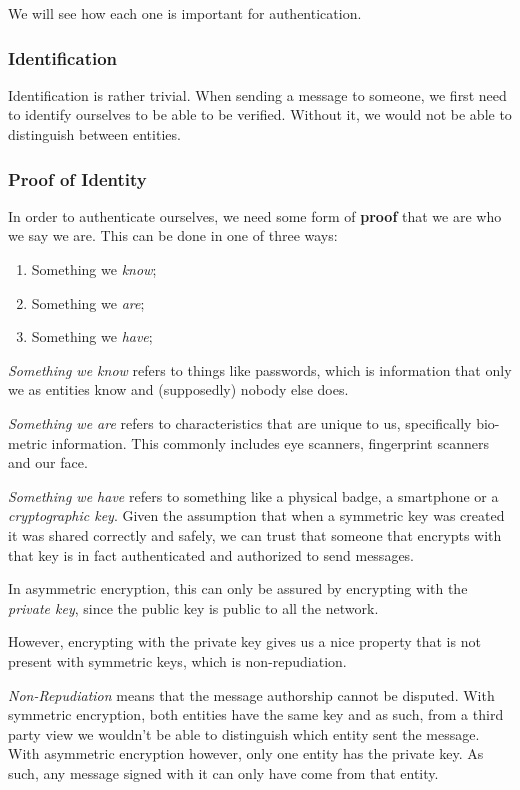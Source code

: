 \documentclass[12pt,a4paper]{article}
\theoremstyle{definition}
\begin{document}
We will see how each one is important for authentication.

\subsubsection{Identification}

Identification is rather trivial. When sending a message to someone, we first need to identify ourselves to be able to be verified. Without it, we would not be able to distinguish between entities.

\subsubsection{Proof of Identity}

In order to authenticate ourselves, we need some form of \textbf{proof} that we are who we say we are. 
This can be done in one of three ways:
\begin{enumerate}
    \item Something we \emph{know};
    \item Something we \emph{are};
    \item Something we \emph{have};
\end{enumerate}

\emph{Something we know} refers to things like passwords, which is information that only we as entities know and (supposedly) nobody else does.

\emph{Something we are} refers to characteristics that are unique to us, specifically bio-metric information. This commonly includes eye scanners, fingerprint scanners and our face. 

\emph{Something we have} refers to something like a physical badge, a smartphone or a \emph{cryptographic key}.
Given the assumption that when a symmetric key was created it was shared correctly and safely, we can trust that someone that encrypts with that key is in fact authenticated and authorized to send messages. 

In asymmetric encryption, this can only be assured by encrypting with the \emph{private key}, since the public key is public to all the network.

However, encrypting with the private key gives us a nice property that is not present with symmetric keys, which is non-repudiation.

\emph{Non-Repudiation} means that the message authorship cannot be disputed. With symmetric encryption, both entities have the same key and as such, from a third party view we wouldn't be able to distinguish which entity sent the message. With asymmetric encryption however, only one entity has the private key. As such, any message signed with it can only have come from that entity.
\end{document}
